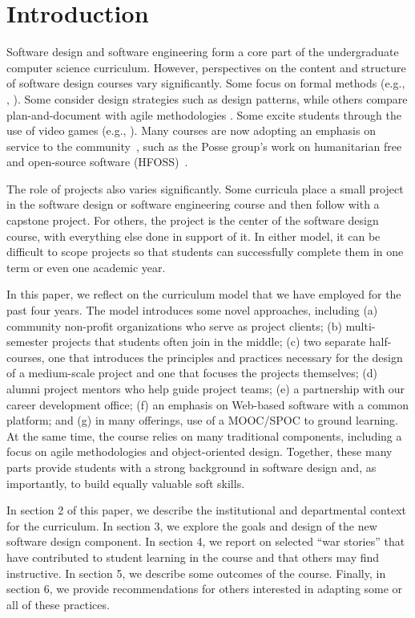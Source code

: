 
\section{Introduction}

Software design and software engineering form a core part of
the undergraduate computer science curriculum. However, perspectives
on the content and structure of software design courses vary
significantly.  Some focus on formal methods (e.g., \cite{liu-2009},
\cite{garcia-2014}).  Some consider design strategies such as design
patterns, while others compare plan-and-document with agile
methodologies \cite{gestwicki-2018}.  Some excite students through
the use of video games (e.g., \cite{wolz-2007}).  Many courses are
now adopting an emphasis on service to the community~\cite{hfoss-2018},
such as the Posse group's work on humanitarian free and open-source
software (HFOSS)~\cite{posse-2018}.

The role of projects also varies significantly.  Some curricula
place a small project in the software design or software engineering
course and then follow with a capstone project.  For others, the
project is the center of the software design course, with everything
else done in support of it. In either model, it can be difficult
to scope projects so that students can successfully complete them
in one term or even one academic year.

In this paper, we reflect on the curriculum model that we have
employed for the past four years.  The model introduces some novel
approaches, including (a) community non-profit organizations who
serve as project clients; (b) multi-semester projects that students
often join in the middle; (c) two separate half-courses, one that
introduces the principles and practices necessary for the design
of a medium-scale project and one that focuses the projects themselves;
(d) alumni project mentors who help guide project teams; (e) a
partnership with our career development office; (f) an emphasis on
Web-based software with a common platform; and (g) in many offerings,
use of a MOOC/SPOC to ground learning.  At the same time, the course
relies on many traditional components, including a focus on agile
methodologies and object-oriented design.  Together, these many
parts provide students with a strong background in software design
and, as importantly, to build equally valuable soft skills.

In section 2 of this paper, we describe the institutional and
departmental context for the curriculum.  In section 3, we explore
the goals and design of the new software design component.  In
section 4, we report on selected ``war stories'' that have contributed
to student learning in the course and that others may find instructive.
In section 5, we describe some outcomes of the course.  Finally,
in section 6, we provide recommendations for others interested in
adapting some or all of these practices.

